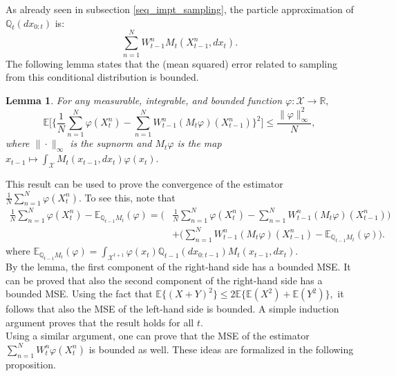 \documentclass[
]{book}
\theoremstyle{break}
\newtheorem{lemma}{Lemma}
\theoremstyle{nonumberplain}
\begin{document}
As already seen in subsection \ref{seq_impt_sampling}, the particle
approximation of \(\mathbb Q_{t}(dx_{0:t})\) is: \begin{equation*}
      \sum_{n=1}^NW_{t-1}^nM_t(X_{t-1}^n,dx_t).
\end{equation*} The following lemma states that the (mean squared) error
related to sampling from this conditional distribution is bounded.
\bigskip

\begin{lemma}
For any measurable, integrable, and bounded function $\varphi:\mathcal X\rightarrow\mathbb R,$
$$
\mathbb E\Bigg[ \bigg\{ \frac{1}{N} \sum\limits_{n=1}^N \varphi(X_t^n)-\sum\limits_{n=1}^NW_{t-1}^n(M_t\varphi)(X_{t-1}^n) \bigg\}^2 \Bigg]\leq \frac{\|\varphi\|_{\infty}^2}{N},
$$
where $\|\cdot\|_{\infty}$ is the supnorm and $M_t\varphi$ is the map 
$x_{t-1}\mapsto \int_{\mathcal X}M_t(x_{t-1},dx_t)\varphi(x_t).$
\end{lemma}

This result can be used to prove the convergence of the estimator
\(\frac{1}{N} \sum\limits_{n=1}^N \varphi(X_t^n)\). To see this, note
that \begin{equation}
    \begin{split}
        \frac{1}{N} \sum\limits_{n=1}^N \varphi(X_t^n)-\mathbb E_{\mathbb Q_{t-1}M_t}(\varphi)=\bigg(&\frac{1}{N} \sum\limits_{n=1}^N \varphi(X_t^n)-\sum\limits_{n=1}^NW_{t-1}^n(M_t\varphi)(X_{t-1}^n) \bigg) \\
        & + \bigg(\sum\limits_{n=1}^NW_{t-1}^n(M_t\varphi)(X_{t-1}^n)- \mathbb E_{\mathbb Q_{t-1}M_t}(\varphi)\bigg).
    \end{split}
\end{equation} where
\(\mathbb E_{\mathbb Q_{t-1}M_t}(\varphi)=\int_{\mathcal X^{t+1}}\varphi(x_t) \mathbb Q_{t-1}(dx_{0:t-1})M_t(x_{t-1},dx_t)\).\\
By the lemma, the first component of the right-hand side has a bounded
MSE. It can be proved that also the second component of the right-hand
side has a bounded MSE. Using the fact that
\(\mathbb E\{(X+Y)^2\}\leq2\mathbb E\{\mathbb E(X^2)+\mathbb E(Y^2)\},\)
it follows that also the MSE of the left-hand side is bounded. A simple
induction argument proves that the result holds for all \(t\).\\
Using a similar argument, one can prove that the MSE of the estimator
\(\sum\limits_{n=1}^N W_t^n \varphi(X_t^n)\) is bounded as well. These
ideas are formalized in the following proposition. \bigskip
\end{document}
